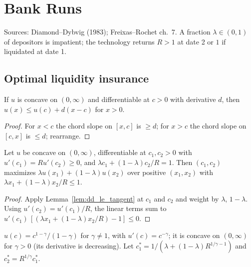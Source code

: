 \chapter{Bank Runs}
\label{chap:banking}

Sources: Diamond--Dybvig (1983); Freixas--Rochet ch.~7. A fraction $\lambda \in (0,1)$ of depositors is impatient;
the technology returns $R > 1$ at date 2 or $1$ if liquidated at date 1.

\section{Optimal liquidity insurance}
\label{sec:dd_insurance}

\begin{lemma}
\label{lem:dd_le_tangent}
\leanok
If $u$ is concave on $(0, \infty)$ and differentiable at $c > 0$ with derivative $d$, then
$u(x) \le u(c) + d(x - c)$ for $x > 0$.
\end{lemma}
\begin{proof}
\leanok
For $x < c$ the chord slope on $[x, c]$ is $\ge d$; for $x > c$ the chord slope on $[c, x]$ is $\le d$; rearrange.
\end{proof}

\begin{theorem}
\label{thm:dd_optimal_of_foc}
\leanok
{}
Let $u$ be concave on $(0, \infty)$, differentiable at $c_1, c_2 > 0$ with $u'(c_1) = R u'(c_2) \ge 0$, and
$\lambda c_1 + (1-\lambda)c_2/R = 1$. Then $(c_1, c_2)$ maximizes $\lambda u(x_1) + (1-\lambda) u(x_2)$ over positive
$(x_1, x_2)$ with $\lambda x_1 + (1-\lambda)x_2/R \le 1$.
\end{theorem}
\begin{proof}
\leanok
Apply Lemma~\ref{lem:dd_le_tangent} at $c_1$ and $c_2$ and weight by $\lambda$, $1 - \lambda$. Using $u'(c_2) = u'(c_1)/R$,
the linear terms sum to $u'(c_1)\,[(\lambda x_1 + (1-\lambda)x_2/R) - 1] \le 0$.
\end{proof}

\begin{definition}
\label{def:dd_crra}
\leanok
$u(c) = c^{1-\gamma}/(1-\gamma)$ for $\gamma \neq 1$, with $u'(c) = c^{-\gamma}$; it is concave on $(0, \infty)$ for $\gamma > 0$
(its derivative is decreasing). Let $c_1^* = 1/(\lambda + (1-\lambda)R^{1/\gamma - 1})$ and $c_2^* = R^{1/\gamma} c_1^*$.
\end{definition}

